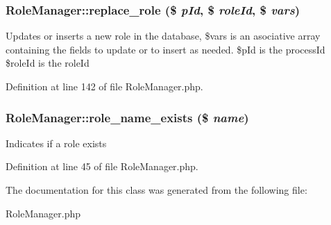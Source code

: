 \subsubsection{\setlength{\rightskip}{0pt plus 5cm}Role\-Manager::replace\_\-role (\$ {\em p\-Id}, \$ {\em role\-Id}, \$ {\em vars})}\label{classRoleManager_a8}


Updates or inserts a new role in the database, \$vars is an asociative array containing the fields to update or to insert as needed. \$p\-Id is the process\-Id \$role\-Id is the role\-Id 

Definition at line 142 of file Role\-Manager.php.
\subsubsection{\setlength{\rightskip}{0pt plus 5cm}Role\-Manager::role\_\-name\_\-exists (\$ {\em name})}\label{classRoleManager_a2}


Indicates if a role exists 

Definition at line 45 of file Role\-Manager.php.

The documentation for this class was generated from the following file:\begin{CompactItemize}
\item 
Role\-Manager.php\end{CompactItemize}
